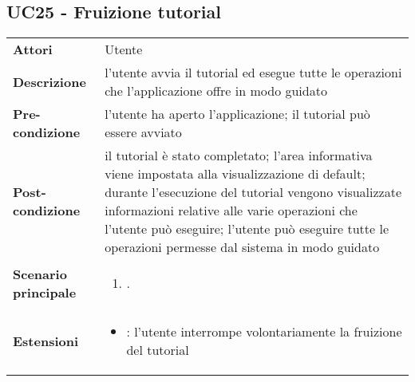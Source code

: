 \subsection{UC25 - Fruizione tutorial} 
\label{sssec:UC25} 
\def\arraystretch{1.5}
\begin{tabularx}{\textwidth}{l|p{}}
	\rowcolor{I} \multicolumn{2}{c}{\color{white}\textbf{UC25 - Avvio tutorial}} \\
	\toprule
	\endhead
	\textbf{Attori} & Utente\\
	\textbf{Descrizione} & l'utente avvia il tutorial ed esegue tutte le operazioni che l'applicazione offre in modo guidato\\
	\textbf{Pre-condizione} & l'utente ha aperto l'applicazione; il tutorial può essere avviato\\
	\textbf{Post-condizione} & il tutorial è stato completato; l'area informativa viene impostata alla visualizzazione di default; durante l'esecuzione del tutorial vengono visualizzate informazioni relative alle varie operazioni che l'utente può eseguire; l'utente può eseguire tutte le operazioni permesse dal sistema in modo guidato\\
	\textbf{Scenario principale} & \vspace{-1.2em}\begin{enumerate}[leftmargin=*,noitemsep,nosep]
		\item \nameref{sssec:UC25}.
	\end{enumerate}\\
	\textbf{Estensioni} & \vspace{-1.2em}\begin{itemize}[leftmargin=*,noitemsep,nosep]
	\item \nameref{sssec:UC46}: l'utente interrompe volontariamente
	la fruizione del tutorial
\end{itemize}\\
	\bottomrule
\end{tabularx}
